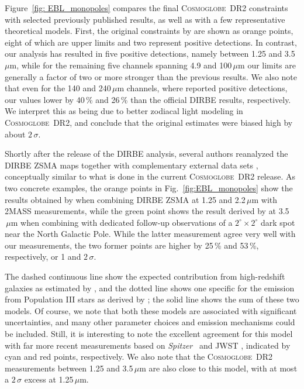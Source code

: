 \documentclass{aa}
\def\Spitzer{\textit{Spitzer}}
\newcommand{\cosmoglobe}{\textsc{Cosmoglobe}}
\begin{document}
Figure~\ref{fig: EBL_monopoles} compares the final \cosmoglobe\ DR2
constraints with selected previously published results, as well as
with a few representative theoretical models. First, the original
constraints by \citet{hauser1998} are shown as orange points, eight of
which are upper limits and two represent positive detections. In
contrast, our analysis has resulted in five positive detections,
namely between 1.25 and 3.5\,$\mu\mathrm{m}$, while for the remaining
five channels spanning 4.9 and 100$\,\mu\mathrm{m}$ our limits are
generally a factor of two or more stronger than the previous
results. We also note that even for the 140 and 240$\,\mu\mathrm{m}$
channels, where \citet{hauser1998} reported positive detections, 
our values lower by 40\,\% and 26\,\% than the official DIRBE results,
respectively. We interpret this as being due to better zodiacal light
modeling in \cosmoglobe\ DR2, and conclude that the
original estimates were biased high by about $2\,\sigma$.

Shortly after the release of the DIRBE analysis, several authors
reanalyzed the DIRBE ZSMA maps together with complementary external
data sets \citep[e.g.,][]{wright:2000,wright:2001}, conceptually
similar to what is done in the current \cosmoglobe\ DR2 release. As
two concrete examples, the orange points in
Fig.~\ref{fig:EBL_monopoles} show the results obtained by
\citet{cambresy:2001} when combining DIRBE ZSMA at 1.25 and
2.2$\,\mu\mathrm{m}$ with 2MASS measurements, while the green point
shows the result derived by \citet{gorjian:2000} at
3.5$\,\mu\mathrm{m}$ when combining with dedicated follow-up
observations of a $2^{\circ}\times2^{\circ}$ dark spot near the North
Galactic Pole. While the latter measurement agree very well with our
measurements, the two former points are higher by 25\,\% and 53\,\%,
respectively, or 1 and $2\,\sigma$.

The dashed continuous line show the expected contribution from
high-redshift galaxies as estimated by \citet{finke2022}, and the
dotted line shows one specific for the emission from Population III
stars as derived by \citet{santos:2002}; the solid line shows the sum
of these two models. Of course, we note that both these models are
associated with significant uncertainties, and many other parameter
choices and emission mechanisms could be included. Still, it is
interesting to note the excellent agreement for this model with far
more recent measurements based on \Spitzer\ \citep{bethermin:2010} and
JWST \citep{stone:2024}, indicated by cyan and red points,
respectively. We also note that the \cosmoglobe\ DR2 measurements
between 1.25 and 3.5$\,\mu\mathrm{m}$ are also close to this model,
with at most a $2\,\sigma$ excess at 1.25$\,\mu\mathrm{m}$.
\end{document}
